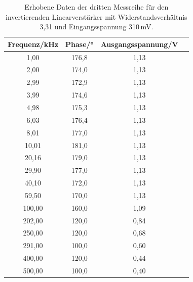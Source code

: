                 \begin{table}
                    \centering
                    \caption{Erhobene Daten der dritten Messreihe  für den invertierenden Linearverstärker 
                    mit Widerstandsverhältnis 3,31 und Eingangsspannung 310\,mV.}
                    \label{tab:inv4}
                    \begin{tabular}{c c c c}
                        \toprule
                            Frequenz/kHz  & Phase/° & Ausgangsspannung/V\\
                        \midrule
                              1,00 & 176,8 & 1,13\\
                              2,00 & 174,0 & 1,13\\
                              2,99 & 172,9 & 1,13\\ 
                              3,99 & 174,6 & 1,13\\
                              4,98 & 175,3 & 1,13\\
                              6,03 & 176,4 & 1,13\\
                              8,01 & 177,0 & 1,13\\
                             10,01 & 181,0 & 1,13\\
                             20,16 & 179,0 & 1,13\\
                             29,90 & 177,0 & 1,13\\
                             40,10 & 172,0 & 1,13\\ 
                             59,50 & 170,0 & 1,13\\ 
                            100,00 & 160,0 & 1,09\\
                            202,00 & 120,0 & 0,84\\
                            250,00 & 120,0 & 0,68\\
                            291,00 & 100,0 & 0,60\\
                            400,00 & 120,0 & 0,44\\
                            500,00 & 100,0 & 0,40\\                    
                        \bottomrule
                    \end{tabular}
                \end{table}            

